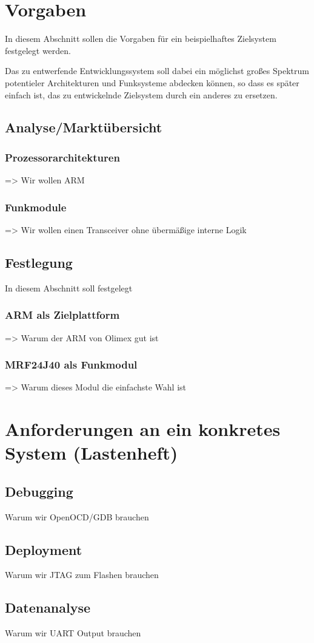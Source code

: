 \section{Vorgaben} In diesem Abschnitt sollen die Vorgaben für ein
beispielhaftes Zielsystem festgelegt werden. 

Das zu entwerfende Entwicklungssystem soll dabei ein möglichst großes Spektrum
potentieler Architekturen und Funksysteme abdecken können, so dass es später
einfach ist, das zu entwickelnde Zielsystem durch ein anderes zu ersetzen.
\subsection{Analyse/Marktübersicht}
\subsubsection{Prozessorarchitekturen} => Wir wollen ARM
\subsubsection{Funkmodule} => Wir wollen einen Transceiver ohne übermäßige
interne Logik
\subsection{Festlegung} In diesem Abschnitt soll festgelegt
\subsubsection{ARM als Zielplattform} => Warum der ARM von Olimex gut ist
\subsubsection{MRF24J40 als Funkmodul} => Warum dieses Modul die einfachste Wahl
ist
\section{Anforderungen an ein konkretes System (Lastenheft)}
\subsection{Debugging} Warum wir OpenOCD/GDB brauchen
\subsection{Deployment} Warum wir JTAG zum Flashen brauchen
\subsection{Datenanalyse} Warum wir UART Output brauchen





